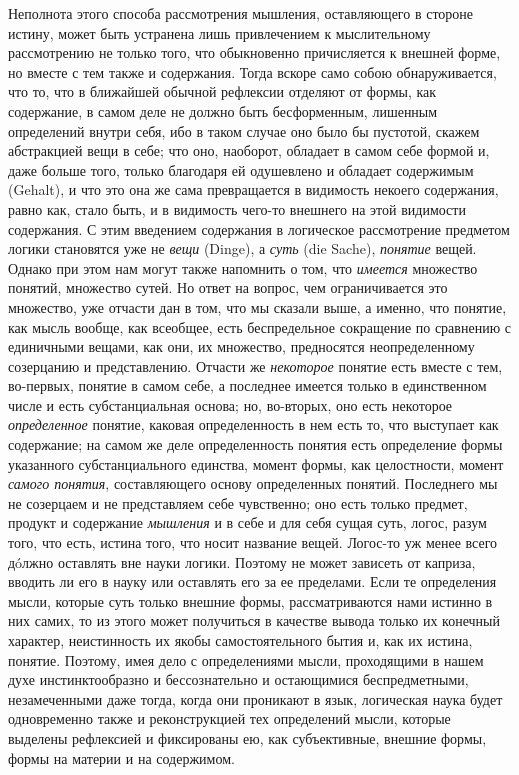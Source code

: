 Неполнота этого способа рассмотрения мышления, оставляющего в стороне
истину, может быть устранена лишь привлечением к мыслительному рассмотрению
не только того, что обыкновенно причисляется к внешней форме, но вместе с
тем также и содержания. Тогда вскоре само собою обнаруживается, что то, что
в ближайшей обычной рефлексии отделяют от формы, как содержание, в самом
деле не должно быть бесформенным, лишенным определений внутри себя, ибо в
таком случае оно было бы пустотой, скажем абстракцией вещи в себе; что оно,
наоборот, обладает в самом себе формой и, даже больше того, только
благодаря ей одушевлено и обладает содержимым (Gehalt), и что это она же
сама превращается в видимость некоего содержания, равно как, стало быть, и
в видимость чего-то внешнего на этой видимости содержания. С этим введением
содержания в логическое рассмотрение предметом логики становятся уже не
{\em вещи} (Dinge), а {\em суть}
(die Sache), {\em понятие} вещей. Однако при этом нам
могут также напомнить о том, что {\em имеется}
множество понятий, множество сутей. Но ответ на вопрос, чем ограничивается
это множество, уже отчасти дан в том, что мы сказали выше, а именно, что
понятие, как мысль вообще, как всеобщее, есть беспредельное сокращение по
сравнению с единичными вещами, как они, их множество, предносятся
неопределенному созерцанию и представлению. Отчасти же
{\em некоторое} понятие есть вместе с тем, во-первых,
понятие в самом себе, а последнее имеется только в единственном числе и
есть субстанциальная основа; но, во-вторых, оно есть некоторое
{\em определенное} понятие, каковая определенность в
нем есть то, что выступает как содержание; на самом же деле определенность
понятия есть определение формы указанного субстанциального единства, момент
формы, как целостности, момент {\em самого понятия},
составляющего основу определенных понятий. Последнего мы не созерцаем и не
представляем себе чувственно; оно есть только предмет, продукт и содержание
{\em мышления} и в себе и для себя сущая суть, логос,
разум того, что есть, истина того, что носит название вещей. Логос-то уж
менее всего дóлжно оставлять вне науки логики. Поэтому не может зависеть от
каприза, вводить ли его в науку или оставлять его за ее пределами. Если те
определения мысли, которые суть только внешние формы, рассматриваются нами
истинно в них самих, то из этого может получиться в качестве вывода только
их конечный характер, неистинность их якобы самостоятельного бытия и, как
их истина, понятие. Поэтому, имея дело с определениями мысли, проходящими в
нашем духе инстинктообразно и бессознательно и остающимися беспредметными,
незамеченными даже тогда, когда они проникают в язык, логическая наука
будет одновременно также и реконструкцией тех определений мысли, которые
выделены рефлексией и фиксированы ею, как субъективные, внешние формы,
формы на материи и на содержимом.

